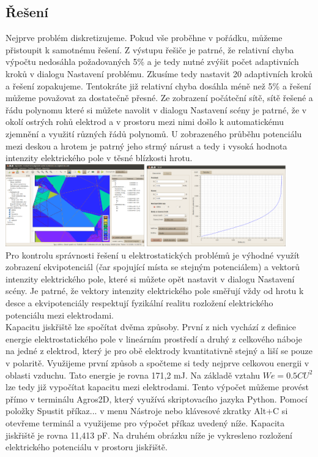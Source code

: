 \documentclass[a4paper, oneside]{article}
\begin{document}
\subsection{Řešení}
Nejprve problém diskretizujeme. Pokud vše proběhne v pořádku, můžeme přistoupit k samotnému řešení. Z výstupu řešiče je patrné, že relativní chyba výpočtu nedosáhla požadovaných 5\% a je tedy nutné zvýšit počet adaptivních kroků v dialogu Nastavení problému. Zkusíme tedy nastavit 20 adaptivních kroků a řešení zopakujeme. Tentokráte již relativní chyba dosáhla méně než 5\% a řešení můžeme považovat za dostatečně přesné. Ze zobrazení počáteční sítě, sítě řešené a řádu polynomu které si můžete navolit v dialogu Nastavení scény je patrné, že v okolí ostrých rohů elektrod a v prostoru mezi nimi došlo k automatickému zjemnění a využití různých řádů polynomů. U zobrazeného průběhu potenciálu mezi deskou a hrotem je patrný jeho strmý nárust a tedy i vysoká hodnota intenzity elektrického pole v těsné blízkosti hrotu.\\
\includegraphics[width=6cm]{Sit_a_rad_polynomu.eps}
\includegraphics[width=6cm]{Graf.eps}\\		
Pro kontrolu správnosti řešení u elektrostatických problémů je výhodné využít zobrazení ekvipotenciál (čar spojující místa se stejným potenciálem) a vektorů intenzity elektrického pole, které si můžete opět nastavit v dialogu Nastavení scény. Je patrné, že vektory intenzity elektrického pole směřují vždy od hrotu k desce a ekvipotenciály respektují fyzikální realitu rozložení elektrického potenciálu mezi elektrodami.\\
Kapacitu jiskřiště lze spočítat dvěma způsoby. První z nich vychází z definice energie elektrostatického pole v lineárním prostředí a druhý z celkového náboje na jedné z elektrod, který je pro obě elektrody kvantitativně stejný a liší se pouze v polaritě. Využijeme první způsob a spočteme si tedy nejprve celkovou energii v oblasti vzduchu. Tato energie je rovna 171,2 mJ. Na základě vztahu $We = 0.5 CU^2$ lze tedy již vypočítat kapacitu mezi elektrodami. Tento výpočet můžeme provést přímo v terminálu Agros2D, který využívá skriptovacího jazyka Python. Pomocí položky Spustit příkaz... v menu Nástroje nebo klávesové zkratky Alt+C si otevřeme terminál a využijeme pro výpočet příkaz uvedený níže. Kapacita jiskřiště je rovna 11,413 pF. Na druhém obrázku níže je vykresleno rozložení elektrického potenciálu v prostoru jiskřiště.\\
\end{document}
